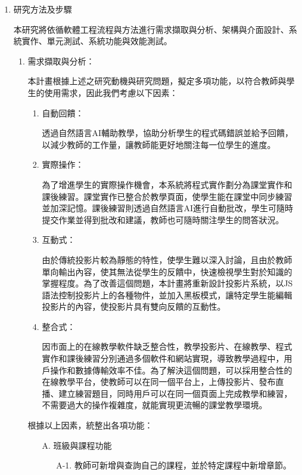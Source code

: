 \documentclass[12pt]{article}
\begin{document}
\begin{enumerate}
  \item 研究方法及步驟
    \par 本研究將依循軟體工程流程與方法進行需求擷取與分析、架構與介面設計、系統實作、單元測試、系統功能與效能測試。
    \begin{enumerate}
      \setlength{\parindent}{2em}
      \item 需求擷取與分析：
        \par 本計畫根據上述之研究動機與研究問題，擬定多項功能，以符合教師與學生的使用需求，因此我們考慮以下因素：
        \begin{enumerate}
          \setlength{\parindent}{2em}
          \item 自動回饋：
            \par 透過自然語言AI輔助教學，協助分析學生的程式碼錯誤並給予回饋，以減少教師的工作量，讓教師能更好地關注每一位學生的進度。
          \item 實際操作：
            \par 為了增進學生的實際操作機會，本系統將程式實作劃分為課堂實作和課後練習。課堂實作已整合於教學頁面，使學生能在課堂中同步練習並加深記憶。課後練習則透過自然語言AI進行自動批改，學生可隨時提交作業並得到批改和建議，教師也可隨時關注學生的問答狀況。
          \item 互動式：
            \par 由於傳統投影片較為靜態的特性，使學生難以深入討論，且由於教師單向輸出內容，使其無法從學生的反饋中，快速檢視學生對於知識的掌握程度。為了改善這個問題，本計畫將重新設計投影片系統，以JS語法控制投影片上的各種物件，並加入黑板模式，讓特定學生能編輯投影片的內容，使投影片具有雙向反饋的互動性。
          \item 整合式：
            \par 因市面上的在線教學軟件缺乏整合性，教學投影片、在線教學、程式實作和課後練習分別通過多個軟件和網站實現，導致教學過程中，用戶操作和數據傳輸效率不佳。為了解決這個問題，可以採用整合性的在線教學平台，使教師可以在同一個平台上，上傳投影片、發布直播、建立練習題目，同時用戶可以在同一個頁面上完成教學和練習，不需要過大的操作複雜度，就能實現更流暢的課堂教學環境。
        \end{enumerate}
      \par 根據以上因素，統整出各項功能：
        \begin{enumerate}
          \item [A.] 班級與課程功能
            \begin{enumerate}
              \item [A-1.] 教師可新增與查詢自己的課程，並於特定課程中新增章節。

\end{enumerate}
\end{enumerate}
\end{enumerate}
\end{enumerate}
\end{document}
